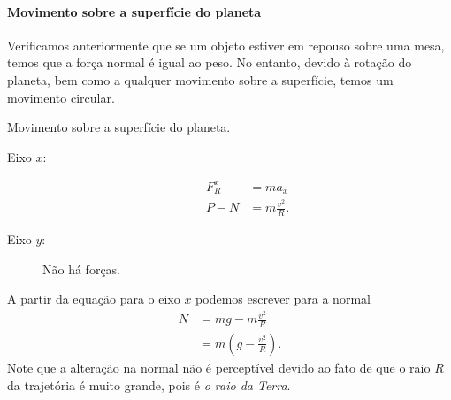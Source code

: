 \paragraph{Movimento sobre a superfície do planeta}

Verificamos anteriormente que se um objeto estiver em repouso sobre uma mesa, temos que a força normal é igual ao peso. No entanto, devido à rotação do planeta, bem como a qualquer movimento sobre a superfície, temos um movimento circular.

\begin{marginfigure}
\centering
{}
\caption{Movimento sobre a superfície do planeta.}
\end{marginfigure}

\begin{description}
    \item[Eixo $x$:] 
        \begin{align}
            F_R^x &= m a_x \\
            P - N &= m \frac{v^2}{R}.
        \end{align}
    \item[Eixo $y$:] Não há forças.
\end{description}

\noindent{}A partir da equação para o eixo $x$ podemos escrever para a normal
\begin{align}
    N &= mg-m\frac{v^2}{R} \\
    &= m \left(g - \frac{v^2}{R}\right).
\end{align}
%
Note que a alteração na normal não é perceptível devido ao fato de que o raio $R$ da trajetória é muito grande, pois é \emph{o raio da Terra}.

